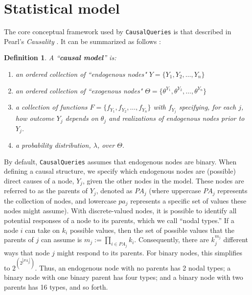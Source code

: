 \documentclass[
  11pt,
  article]{jss}
\newtheorem{definition}{Definition}
\begin{document}
\section{Statistical model}\label{sec-theory}

The core conceptual framework used by \texttt{CausalQueries} is that
described in Pearl's \emph{Causality} \citep{pearl_causality_2009}. It
can be summarized as follows \citep[using notation
from][]{humphreys_integrated_2023}:

\begin{definition}
  
  A ``\textbf{causal model}'' is:
  \begin{enumerate}
    \item an ordered collection of ``endogenous nodes" $Y = \{Y_1, Y_2, \dots, Y_n\}$
    \item an ordered collection of ``exogenous nodes" $\Theta = \{\theta^{Y_1}, \theta^{Y_2}, \dots, \theta^{Y_n}\}$
    \item a collection of functions $F = \{f_{Y_1}, f_{Y_2}, \dots, f_{Y_n}\}$ with $f_{Y_j}$ specifying, for each $j$, how outcome $Y_j$ depends on $\theta_j$ and realizations of endogenous nodes prior to $Y_j$.
    \item a probability distribution, $\lambda$, over $\Theta$.
  \end{enumerate}
  
\end{definition}

By default, \texttt{CausalQueries} assumes that endogenous nodes are
binary. When defining a causal structure, we specify which endogenous
nodes are (possible) direct causes of a node, \(Y_j\), given the other
nodes in the model. These nodes are referred to as the parents of
\(Y_j\), denoted as \(PA_j\) (where uppercase \(PA_j\) represents the
collection of nodes, and lowercase \(pa_j\) represents a specific set of
values these nodes might assume). With discrete-valued nodes, it is
possible to identify all potential responses of a node to its parents,
which we call ``nodal types.'' If a node \(i\) can take on \(k_i\)
possible values, then the set of possible values that the parents of
\(j\) can assume is \(m_j :=\prod_{i\in PA_j}k_i\). Consequently, there
are \(k_j^{m_j}\) different ways that node \(j\) might respond to its
parents. For binary nodes, this simplifies to
\(2^{\left(2^{|PA_j|}\right)}\). Thus, an endogenous node with no
parents has 2 nodal types; a binary node with one binary parent has four
types; and a binary node with two parents has 16 types, and so forth.
\end{document}
